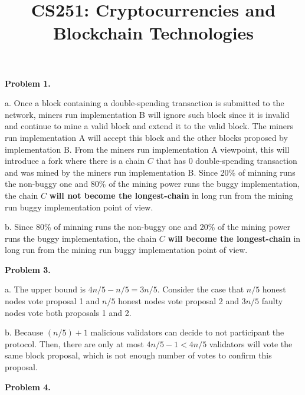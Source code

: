 \documentclass{article}
\title{CS251: Cryptocurrencies and Blockchain Technologies \exerciseset}
\begin{document}
\maketitle 


\textbf{Problem 1.}

\vspace{12pt}
 
a. Once a block containing a double-spending transaction is submitted to the network, miners run implementation B will ignore such block since it is invalid and continue to mine a valid block and extend it to the valid block. The miners run implementation A will accept this block and the other blocks proposed by implementation B. From the miners run implementation A viewpoint, this will introduce a fork where there is a chain $C$ that has 0 double-spending transaction and was mined by the miners run implementation B. Since 20\% of minning runs the non-buggy one and 80\% of the mining power runs the buggy implementation, the chain $C$ \textbf{will not become the longest-chain} in long run from the mining run buggy implementation point of view.

\vspace{12pt}

b. Since 80\% of minning runs the non-buggy one and 20\% of the mining power runs the buggy implementation, the chain $C$ \textbf{will become the longest-chain} in long run from the mining run buggy implementation point of view.


\vspace{12pt}


\textbf{Problem 3.}

\vspace{12pt}

a. The upper bound is $4n/5 - n/5 = 3n/5$. Consider the case that $n/5$ honest nodes vote proposal 1 and $n/5$ honest nodes vote proposal 2 and $3n/5$ faulty nodes vote both proposals 1 and 2. 

\vspace{12pt}

b. Because $(n/5) + 1$ malicious validators can decide to not participant the protocol. Then, there are only at most $4n/5 - 1 < 4n/5$ validators will vote the same block proposal, which is not enough number of votes to confirm this proposal.


\vspace{12pt}

\textbf{Problem 4.}

\vspace{12pt}
\end{document}
